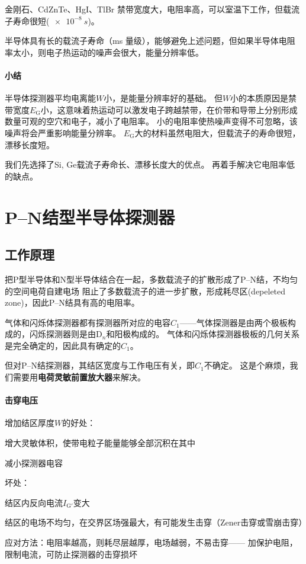 金刚石、CdZnTe、HgI、TlBr
禁带宽度大，电阻率高，可以室温下工作，但载流子寿命很短($\qty{e-8}{s}$)。

半导体具有长的载流子寿命（\unit{ms} 量级），能够避免上述问题，但如果半导体电阻率太小，则电子热运动的噪声会很大，能量分辨率低。
\paragraph{小结}
半导体探测器平均电离能$W$小，是能量分辨率好的基础。
但$W$小的本质原因是禁带宽度$E_{\mathrm{G}}$小，这意味着热运动可以激发电子跨越禁带，在价带和导带上分别形成数量可观的空穴和电子，减小了电阻率。
小的电阻率使热噪声变得不可忽略，该噪声将会严重影响能量分辨率。
$E_{\mathrm{G}}$大的材料虽然电阻大，但载流子的寿命很短，漂移长度短。

我们先选择了Si, Ge载流子寿命长、漂移长度大的优点。
再着手解决它电阻率低的缺点。

\section{P--N结型半导体探测器}

\subsection{工作原理}

把P型半导体和N型半导体结合在一起，多数载流子的扩散形成了P--N结，不均匀的空间电荷自建电场
阻止了多数载流子的进一步扩散，形成耗尽区(depeleted zone)，因此P--N结具有高的电阻率。

气体和闪烁体探测器都有探测器所对应的电容$C_1$——气体探测器是由两个极板构成的，闪烁探测器则是由D$_n$和阳极构成的。%
气体和闪烁体探测器极板的几何关系是完全确定的，因此具有确定的$C_1$。

但对P--N结探测器，其结区宽度与工作电压有关，即$C_1$不确定。
这是个麻烦，我们需要用\textbf{电荷灵敏前置放大器}来解决。
\paragraph{击穿电压}
增加结区厚度$W$的好处：
\begin{compactitem}
	\item 增大灵敏体积，使带电粒子能量能够全部沉积在其中
	\item 减小探测器电容
\end{compactitem}
坏处：
\begin{compactenum}
	\item 结区内反向电流$I_{\mathrm{G}'}$变大
	\item 结区的电场不均匀，在交界区场强最大，有可能发生击穿（Zener击穿或雪崩击穿）
\end{compactenum}
应对方法：电阻率越高，则耗尽层越厚，电场越弱，不易击穿——
加保护电阻，限制电流，可防止探测器的击穿损坏

